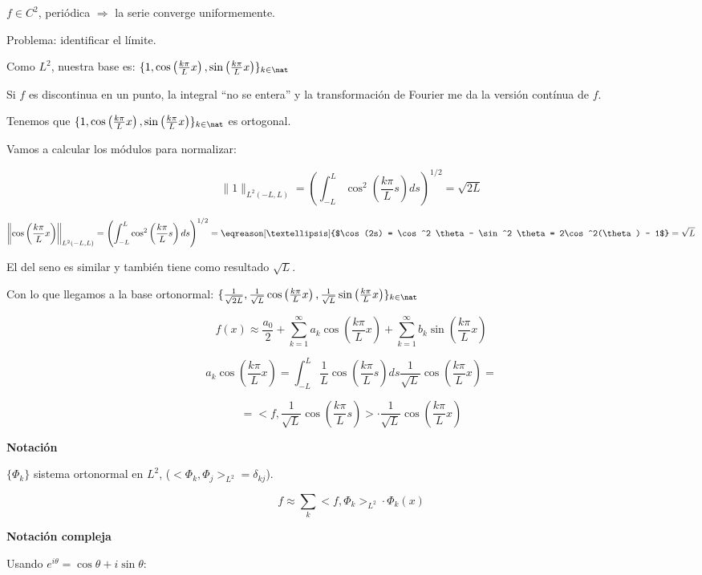		$f \in C^2$, periódica $\Rightarrow$ la serie converge uniformemente.

		Problema: identificar el límite.

		Como $L^2$, nuestra base es: $\{1, \cos \left( \frac{k \pi}{L} x \right), \sin \left( \frac{k \pi}{L} x \right)\}_{k \in \nat}$

		\obs Si $f$ es discontinua en un punto, la integral ``no se entera'' y la transformación de Fourier me da la versión contínua de $f$.

		Tenemos que $\{1, \cos \left( \frac{k \pi}{L} x \right), \sin \left( \frac{k \pi}{L} x \right)\}_{k \in \nat}$ es ortogonal.

		Vamos a calcular los módulos para normalizar:

		\[\|1\|_{L^2 (-L,L)} = \left( \int_{-L}^L \cos^2  \left( \frac{k \pi}{L} s \right) ds \right)^{1/2} = \sqrt{2L} \]

		\[\left\|\cos \left( \frac{k \pi}{L} x \right)\right\|_{L^2 (-L,L)} = \left( \int_{-L}^L \cos^2  \left( \frac{k \pi}{L} s \right) ds \right)^{1/2} = \eqreason[…]{$\cos(2s) = \cos^2 \theta - \sin^2 \theta = 2\cos^2(\theta) - 1$}  = \sqrt{L} \]

		El del seno es similar y también tiene como resultado $\sqrt{L}$.

		Con lo que llegamos a la base ortonormal: $\{\frac{1}{\sqrt{2L}}, \frac{1}{\sqrt{L}} \cos \left( \frac{k \pi}{L} x \right),\frac{1}{\sqrt{L}} \sin \left( \frac{k \pi}{L} x \right)\}_{k \in \nat}$


		\[ f(x) ≈ \frac{a_0}{2} + \sum_{k=1}^\infty a_k \cos \left( \frac{k \pi}{L} x \right) + \sum_{k=1}^\infty b_k \sin \left( \frac{k \pi}{L} x \right) \]

		\[ a_k \cos \left( \frac{k \pi}{L} x \right) = \int^L_{-L} \frac{1}{L} \cos \left( \frac{k \pi}{L} s \right) ds \frac{1}{\sqrt{L}} \cos \left( \frac{k \pi}{L} x \right) = \]

		\[ = < f, \frac{1}{\sqrt{L}} \cos \left( \frac{k \pi}{L} s \right)> \cdot \frac{1}{\sqrt{L}} \cos \left( \frac{k \pi}{L} x \right) \]


		\textbf{Notación}

		$\{ \Phi_k \} $ sistema ortonormal en $L^2$, ($<\Phi_k,\Phi_j>_{L^2} = \delta_{kj}$).

		\[ f ≈ \sum_k < f, \Phi_k >_{L^2} \cdot \Phi_k (x) \]

		\textbf{Notación compleja}

		Usando $e^{i\theta} = \cos \theta + i \sin \theta$:

